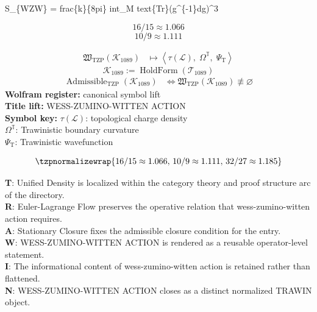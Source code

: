 
\begin{tzpsnapshot}
\end{tzpsnapshot}

S\_\{WZW\} = frac\{k\}\{8pi\} int\_M text\{Tr\}(g\textasciicircum{}\{-1\}dg)\textasciicircum{}3

\[
16/15 \approx 1.066
\]
\[
10/9 \approx 1.111
\]

\noindent
\begin{minipage}[t]{0.48\linewidth}
\begingroup
\small
\[
\begin{aligned}
\mathfrak{W}_{\mathrm{TZP}}\!\left(\mathcal{K}_{1089}\right)
&\longmapsto
\left\langle \tau(\mathcal{L}),\; \Omega^{\mathbb{T}},\; \Psi_{\mathrm{T}} \right\rangle
\end{aligned}
\]
\[
\mathcal{K}_{1089}
:=
\operatorname{HoldForm}\!\left(\mathcal{T}_{1089}\right)
\]
\[
\begin{aligned}
\operatorname{Admissible}_{\mathrm{TZP}}\!\left(\mathcal{K}_{1089}\right)
&\Longleftrightarrow
\mathfrak{W}_{\mathrm{TZP}}\!\left(\mathcal{K}_{1089}\right)\not\equiv\varnothing
\end{aligned}
\]
\textbf{Wolfram register:} canonical symbol lift\\
\textbf{Title lift:} WESS-ZUMINO-WITTEN ACTION\\
\textbf{Symbol key:} \(\tau(\mathcal{L})\): topological charge density\\ \(\Omega^{\mathbb{T}}\): Trawinistic boundary curvature\\ \(\Psi_{\mathrm{T}}\): Trawinistic wavefunction
\par
\endgroup
\end{minipage}\hfill
\begin{minipage}[t]{0.48\linewidth}
\[
\tzpnormalizewrap{16/15 \approx 1.066,\,10/9 \approx 1.111,\,32/27 \approx 1.185}
\]

\small
\textbf{T}: Unified Density is localized within the category theory and proof structure arc of the directory.\\
\textbf{R}: Euler-Lagrange Flow preserves the operative relation that wess-zumino-witten action requires.\\
\textbf{A}: Stationary Closure fixes the admissible closure condition for the entry.\\
\textbf{W}: WESS-ZUMINO-WITTEN ACTION is rendered as a reusable operator-level statement.\\
\textbf{I}: The informational content of wess-zumino-witten action is retained rather than flattened.\\
\textbf{N}: WESS-ZUMINO-WITTEN ACTION closes as a distinct normalized TRAWIN object.
\normalsize
\end{minipage}

